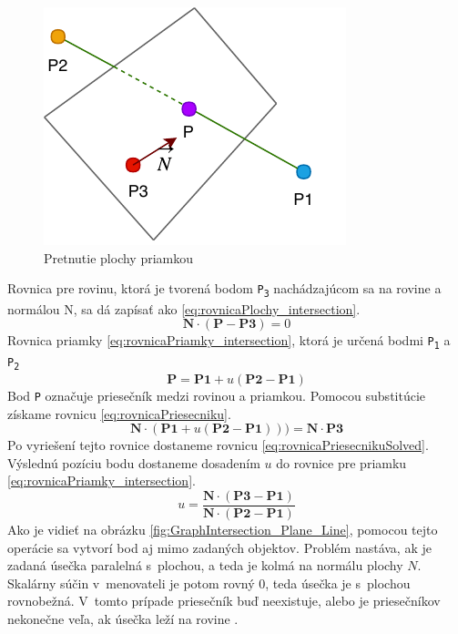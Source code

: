 \begin{figure}[H]
	\centering
	\includegraphics[height=0.3\textwidth]{obrazky-figures/DP Navrh operacii-Intersection.pdf}
	\caption{Pretnutie plochy priamkou}
	\label{fig:Intersection}
\end{figure}
Rovnica pre rovinu, ktorá je tvorená bodom \texttt{P\textsubscript{3}} nachádzajúcom sa na rovine a normálou N, sa dá zapísať ako \ref{eq:rovnicaPlochy_intersection}. 
\begin{equation}
    \textbf{N} \cdot (\textbf{P} - \textbf{P3}) = 0
	\label{eq:rovnicaPlochy_intersection}
\end{equation}
Rovnica priamky \ref{eq:rovnicaPriamky_intersection}, ktorá je určená bodmi \texttt{P\textsubscript{1}} a \texttt{P\textsubscript{2}}
\begin{equation}
	\textbf{P}=\textbf{P1}+u (\textbf{P2}-\textbf{P1})
    \label{eq:rovnicaPriamky_intersection}
\end{equation}
Bod \texttt{P} označuje priesečník medzi rovinou a priamkou. Pomocou substitúcie získame rovnicu \ref{eq:rovnicaPriesecniku}.
\begin{equation}
	\textbf{N} \cdot (\textbf{P1}+u(\textbf{P2}-\textbf{P1}))) = \textbf{N} \cdot \textbf{P3}
    \label{eq:rovnicaPriesecniku}
\end{equation}
Po vyriešení tejto rovnice dostaneme rovnicu \ref{eq:rovnicaPriesecnikuSolved}. Výslednú pozíciu bodu dostaneme dosadením $u$ do rovnice pre  priamku \ref{eq:rovnicaPriamky_intersection}.
\begin{equation}
	u=\frac
{\textbf{N} \cdot (\textbf{P3}-\textbf{P1})}
{\textbf{N} \cdot (\textbf{P2}-\textbf{P1})}
    \label{eq:rovnicaPriesecnikuSolved}
\end{equation}
Ako je vidieť na obrázku \ref{fig:GraphIntersection_Plane_Line}, pomocou tejto operácie sa vytvorí bod aj mimo zadaných objektov. Problém nastáva, ak je zadaná úsečka paralelná s~plochou, a teda je kolmá na normálu plochy $N$. Skalárny súčin v~menovateli je potom rovný 0, teda úsečka je s~plochou rovnobežná. V~tomto prípade priesečník buď neexistuje, alebo je priesečníkov nekonečne veľa, ak úsečka leží na rovine \cite{bourke_Point_Line_Plane}.

